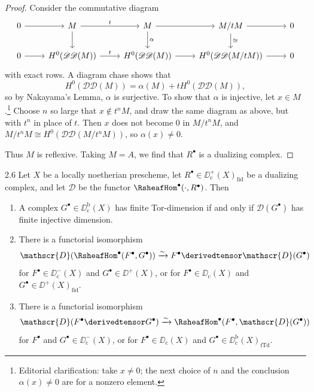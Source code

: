 \begin{proof}
Consider the commutative diagram
\[
\begin{tikzcd}
0\ar[r] & M \ar[r,"t"] \ar[d] & M \ar[r] \ar[d,"\alpha"] & M/tM \ar[r] \ar[d,"\cong"] & 0\\
0\ar[r] & H^0(\mathscr{D}\mathscr{D}(M)) \ar[r,"t"] & H^0(\mathscr{D}\mathscr{D}(M)) \ar[r] & H^0(\mathscr{D}\mathscr{D}(M/tM)) \ar[r] & 0
\end{tikzcd}
\]
with exact rows. A diagram chase shows that
\[
H^{0}(\mathscr{D}\mathscr{D}(M))=\alpha(M)+tH^{0}(\mathscr{D}\mathscr{D}(M)),
\]
so by Nakayama's Lemma, $\alpha$ is surjective. To show that $\alpha$ is injective, let $x\in M$.\footnote{Editorial clarification: take $x\neq0$; the next choice of $n$ and the conclusion $\alpha(x)\neq0$ are for a nonzero element.} Choose $n$ so large that $x\notin t^nM$, and draw the same diagram as above, but with $t^n$ in place of $t$. Then $x$ does not become $0$ in $M/t^nM$, and $M/t^nM\cong H^0(\mathscr{D}\mathscr{D}(M/t^nM))$, so $\alpha(x)\neq0$.

Thus $M$ is reflexive. Taking $M=A$, we find that $R^\bullet$ is a dualizing complex.
\end{proof}

\begin{bookproposition}{2.6}\label{prop:5.2.6}
Let $X$ be a locally noetherian prescheme, let $R^\bullet\in\DD^+_{\mathrm{c}}(X)_{\mathrm{fid}}$ be a dualizing complex, and let $\mathscr{D}$ be the functor $\RsheafHom^\bullet(\cdot,R^\bullet)$. Then
\begin{enumerate}
\item[a)] A complex $G^\bullet\in\DD_{\mathrm{c}}^{\mathrm{b}}(X)$ has finite Tor-dimension  if and only if $\mathscr{D}(G^\bullet)$ has finite injective dimension.
\item[b)] There is a functorial isomorphism
\[
\mathscr{D}(\RsheafHom^\bullet(F^\bullet,G^\bullet)) \xrightarrow{\sim} F^\bullet\derivedtensor \mathscr{D}(G^\bullet)
\]
for $F^\bullet\in\DD_{\mathrm{c}}^-(X)$ and $G^\bullet\in\DD^+(X)$, or for $F^\bullet\in\DD_{\mathrm{c}}(X)$ and $G^\bullet\in\DD^+(X)_{\mathrm{fid}}$.
\item[c)] There is a functorial isomorphism
\[
\mathscr{D}(F^{\bullet}\derivedtensor G^{\bullet}) \xrightarrow{\sim} \RsheafHom^{\bullet}(F^{\bullet}, \mathscr{D}(G^{\bullet}))
\]
for $F^\bullet$ and $G^\bullet\in\DD_{\mathrm{c}}^-(X)$, or for $F^\bullet\in\DD_{\mathrm{c}}(X)$ and $G^\bullet\in\DD_{\mathrm{c}}^{\mathrm{b}}(X)_{\mathrm{fTd}}$.
\end{enumerate}
\end{bookproposition}

